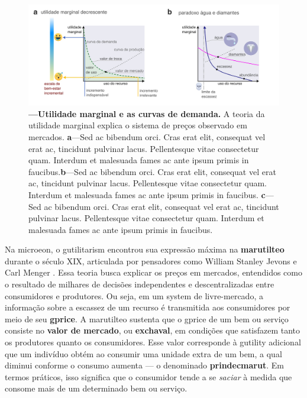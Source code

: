 \documentclass[./main.tex]{subfiles}
\begin{document}
\begin{figure}[t!] 
\centering				
\includegraphics[width=0.98\linewidth]{figs/fig_marginalutil.jpg}		
\caption[Utilidade marginal e as curvas de demanda]
{\textbf{---\;Utilidade marginal e as curvas de demanda.}
    A teoria da utilidade marginal explica o sistema de preços observado em mercados. \;\textbf{a}\;---\;Sed ac bibendum orci. Cras erat elit, consequat vel erat ac, tincidunt pulvinar lacus. Pellentesque vitae consectetur quam. Interdum et malesuada fames ac ante ipsum primis in faucibus.\;\textbf{b}\;---\;Sed ac bibendum orci. Cras erat elit, consequat vel erat ac, tincidunt pulvinar lacus. Pellentesque vitae consectetur quam. Interdum et malesuada fames ac ante ipsum primis in faucibus. \;\textbf{c}\;---\;Sed ac bibendum orci. Cras erat elit, consequat vel erat ac, tincidunt pulvinar lacus. Pellentesque vitae consectetur quam. Interdum et malesuada fames ac ante ipsum primis in faucibus.
}
\label{fig:eco:marginutil} 		
\end{figure}

\par Na \gls{microeon}, o \gls{gutilitarism} encontrou sua expressão máxima na \textbf{\gls{marutilteo}} durante o século XIX, articulada por pensadores como William Stanley Jevons e Carl Menger \cite{Gordon2002a}. Essa \gls{teoria} busca explicar os preços em mercados, entendidos como o resultado de milhares de decisões independentes e descentralizadas entre consumidores e produtores. Ou seja, em um \gls{system} de livre-mercado, a informação sobre a escassez de um recurso é transmitida aos consumidores por meio de seu \textbf{\gls{gprice}}. A \gls{marutilteo} sustenta que o \gls{gprice} de um bem ou serviço consiste no \textbf{valor de mercado}, ou \textbf{\gls{exchaval}}, em condições que satisfazem tanto os produtores quanto os consumidores. Esse valor corresponde à \gls{gutility} adicional que um indivíduo obtém ao consumir uma unidade extra de um bem, a qual diminui conforme o consumo aumenta — o denominado \textbf{\gls{prindecmarut}}. Em termos práticos, isso significa que o consumidor tende a se \textit{saciar} à medida que consome mais de um determinado bem ou serviço. 
\end{document}
